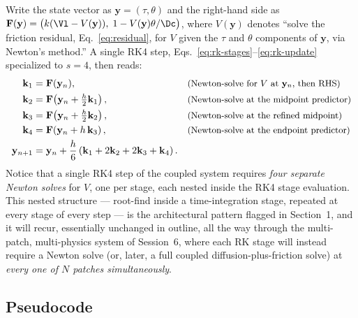 Write the state vector as $\mathbf y = (\tau, \theta)$ and the right-hand side as $\mathbf F(\mathbf y) = \big(k(\Vl - V(\mathbf y)),\; 1 - V(\mathbf y)\theta/\Dc\big)$, where $V(\mathbf y)$ denotes ``solve the friction residual, Eq.~\eqref{eq:residual}, for $V$ given the $\tau$ and $\theta$ components of $\mathbf y$, via Newton's method.'' A single RK4 step, Eqs.~\eqref{eq:rk-stages}--\eqref{eq:rk-update} specialized to $s=4$, then reads:
\begin{align}
\mathbf k_1 &= \mathbf F(\mathbf y_n), & &\text{\small (Newton-solve for $V$ at $\mathbf y_n$, then RHS)}\\
\mathbf k_2 &= \mathbf F\!\left(\mathbf y_n + \tfrac{h}{2}\mathbf k_1\right), & &\text{\small (Newton-solve at the midpoint predictor)}\\
\mathbf k_3 &= \mathbf F\!\left(\mathbf y_n + \tfrac{h}{2}\mathbf k_2\right), & &\text{\small (Newton-solve at the refined midpoint)}\\
\mathbf k_4 &= \mathbf F\!\left(\mathbf y_n + h\,\mathbf k_3\right), & &\text{\small (Newton-solve at the endpoint predictor)}\\
\mathbf y_{n+1} &= \mathbf y_n + \frac{h}{6}\left(\mathbf k_1+2\mathbf k_2+2\mathbf k_3+\mathbf k_4\right).
\end{align}
Notice that a single RK4 step of the coupled system requires \emph{four separate Newton solves} for $V$, one per stage, each nested inside the RK4 stage evaluation. This nested structure --- root-find inside a time-integration stage, repeated at every stage of every step --- is the architectural pattern flagged in Section~1, and it will recur, essentially unchanged in outline, all the way through the multi-patch, multi-physics system of Session~6, where each RK stage will instead require a Newton solve (or, later, a full coupled diffusion-plus-friction solve) at \emph{every one of $N$ patches simultaneously}.

\subsection{Pseudocode}

